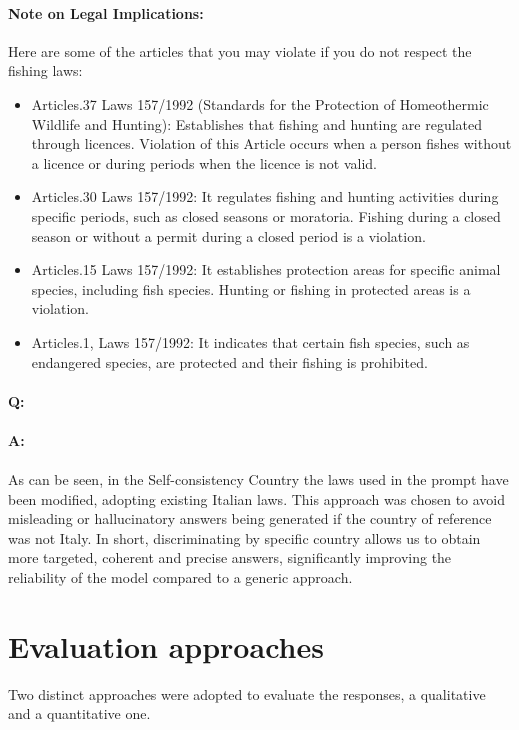 {\begin{enumerate}
    \paragraph{Note on Legal Implications:} Here are some of the articles that you may violate if you do not respect the fishing laws:
    \begin{itemize}
        \item Articles.37 Laws 157/1992 (Standards for the Protection of Homeothermic Wildlife and Hunting):  Establishes that fishing and hunting are regulated through licences. Violation of this Article occurs when a person fishes without a licence or during periods when the licence is not valid.
        \item Articles.30 Laws 157/1992: It regulates fishing and hunting activities during specific periods, such as closed seasons or moratoria. Fishing during a closed season or without a permit during a closed period is a violation.
        \item Articles.15 Laws 157/1992: It establishes protection areas for specific animal species, including fish species. Hunting or fishing in protected areas is a violation.
        \item Articles.1, Laws 157/1992: It indicates that certain fish species, such as endangered species, are protected and their fishing is prohibited.
    \end{itemize}
\end{enumerate}
}
\paragraph{Q:} 
\paragraph{A:}
\paragraph{}
\noindent As can be seen, in the Self-consistency Country the laws used in the prompt have been modified, adopting existing Italian laws. This approach was chosen to avoid misleading or hallucinatory answers being generated if the country of reference was not Italy.
In short, discriminating by specific country allows us to obtain more targeted, coherent and precise answers, significantly improving the reliability of the model compared to a generic approach.
\section{Evaluation approaches}
Two distinct approaches were adopted to evaluate the responses, a qualitative and a quantitative one.
